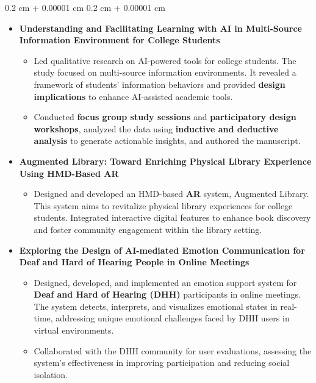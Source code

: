 \documentclass[10pt, letterpaper]{article}
\newenvironment{highlights}{
    \begin{itemize}[
        topsep=0.10 cm,
        parsep=0.10 cm,
        partopsep=0pt,
        itemsep=0pt,
        leftmargin=0.4 cm + 10pt
    ]
}{
    \end{itemize}
} %
\newenvironment{onecolentry}{
    \begin{adjustwidth}{
        0.2 cm + 0.00001 cm
    }{
        0.2 cm + 0.00001 cm
    }
}{
    \end{adjustwidth}
} %
\begin{document}
        \vspace{0.10 cm}
        \begin{onecolentry}
            \begin{highlights}
                \item \textbf{Understanding and Facilitating Learning with AI in Multi-Source Information Environment for College Students}
                \begin{itemize}
                    \item Led qualitative research on AI-powered tools for college students. The study focused on multi-source information environments. It revealed a framework of students' information behaviors and provided \textbf{design implications} to enhance AI-assisted academic tools.
                    \item Conducted \textbf{focus group study sessions} and \textbf{participatory design workshops}, analyzed the data using \textbf{inductive and deductive analysis} to generate actionable insights, and authored the manuscript.
                \end{itemize}
                \item \textbf{Augmented Library: Toward Enriching Physical Library Experience Using HMD-Based AR}
                \begin{itemize}
                    \item Designed and developed an HMD-based \textbf{AR} system, Augmented Library. This system aims to revitalize physical library experiences for college students. Integrated interactive digital features to enhance book discovery and foster community engagement within the library setting.
                \end{itemize}
                \item \textbf{Exploring the Design of AI-mediated Emotion Communication for Deaf and Hard of Hearing People in Online Meetings}
                \begin{itemize}
                    \item Designed, developed, and implemented an emotion support system for \textbf{Deaf and Hard of Hearing (DHH)} participants in online meetings. The system detects, interprets, and visualizes emotional states in real-time, addressing unique emotional challenges faced by DHH users in virtual environments.
                    \item Collaborated with the DHH community for user evaluations, assessing the system's effectiveness in improving participation and reducing social isolation.

\end{itemize}
\end{highlights}
\end{onecolentry}
\end{document}
